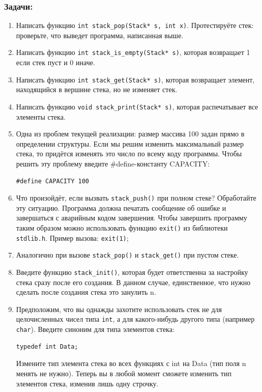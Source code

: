 \documentclass{article}
\begin{document}
\subsubsection*{Задачи:}
\begin{enumerate}
\item Написать функцию \texttt{int stack\_pop(Stack* s, int x)}. Протестируёте стек: проверьте, что выведет программа, написанная выше.
\item Написать функцию \texttt{int stack\_is\_empty(Stack* s)}, которая возвращает 1 если стек пуст и 0 иначе.
\item Написать функцию \texttt{int stack\_get(Stack* s)}, которая возвращает элемент, находящийся в вершине стека, но не изменяет стек.
\item Написать функцию \texttt{void stack\_print(Stack* s)}, которая распечатывает все элементы стека.
\item Одна из проблем текущей реализации: размер массива 100 задан прямо в определении структуры. Если мы решим изменить максимальный размер стека, то придётся изменять это число по всему коду программы.  Чтобы решить эту проблему введите \#define-константу CAPACITY:
\begin{lstlisting}
#define CAPACITY 100
\end{lstlisting}
\item Что произойдёт, если вызвать \texttt{stack\_push()} при полном стеке? Обработайте эту ситуацию. Программа должна печатать сообщение об ошибке и завершаться с аварийным кодом завершения. Чтобы завершить программу таким образом можно использовать функцию \texttt{exit()} из библиотеки \texttt{stdlib.h}. Пример вызова: \texttt{exit(1)};
\item Аналогично при вызове \texttt{stack\_pop()} и \texttt{stack\_get()} при пустом стеке.
\item Введите функцию \texttt{stack\_init()}, которая будет ответственна за настройку стека сразу после его создания. В данном случае, единственное, что нужно сделать после создания стека это занулить n.
\item Предположим, что вы однажды захотите использовать стек не для целочисленных чисел типа \texttt{int}, а для какого-нибудь другого типа (например \texttt{char}). Введите синоним для типа элементов стека:
\begin{verbatim}
typedef int Data;
\end{verbatim}
Измените тип элемента стека во всех функциях с int на Data (тип поля n менять не нужно). Теперь вы в любой момент сможете изменить тип элементов стека, изменив лишь одну строчку.

\end{enumerate}
\end{document}
